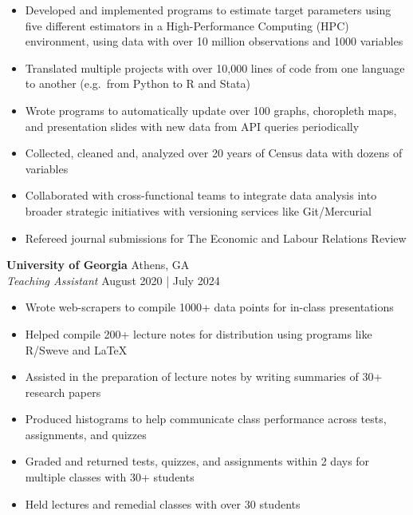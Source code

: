 \documentclass[a4paper]{article}
\begin{document}
\begin{itemize} \itemsep 1pt
	\item Developed and implemented programs to estimate target parameters using five different estimators in a High-Performance Computing (HPC) environment, using data with over 10 million observations and 1000 variables
	\item Translated multiple projects with over 10,000 lines of code from one language to another (e.g.\ from Python to R and Stata)
	\item Wrote programs to automatically update over 100 graphs, choropleth maps, and presentation slides with new data from API queries periodically
	\item Collected, cleaned and, analyzed over 20 years of Census data with dozens of variables
      \item Collaborated with cross-functional teams to integrate data analysis into broader strategic initiatives with versioning services like Git/Mercurial
        \item Refereed journal submissions for The Economic and Labour Relations Review
\end{itemize}
\textbf{University of Georgia} \hfill Athens, GA\\
\textit{Teaching Assistant} \hfill August 2020 | July 2024\\
\vspace{-1mm}
\begin{itemize} \itemsep 1pt
	\item Wrote web-scrapers to compile 1000+ data points for in-class presentations 
	\item Helped compile 200+ lecture notes for distribution using programs like R/Sweve and LaTeX
	\item Assisted in the preparation of lecture notes by writing summaries of 30+ research papers
	\item Produced histograms to help communicate class performance across tests, assignments, and quizzes
	\item Graded and returned tests, quizzes, and assignments within 2 days for multiple classes with 30+ students
	\item Held lectures and remedial classes with over 30 students
\end{itemize}
\end{document}
